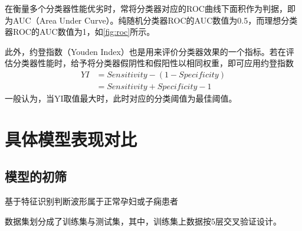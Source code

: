在衡量多个分类器性能优劣时，常将分类器对应的ROC曲线下面积作为判据，即为AUC（Area Under Curve）。纯随机分类器ROC的AUC数值为0.5，而理想分类器ROC的AUC数值为1，如\autoref{fig:roc}所示。

此外，约登指数（Youden Index）也是用来评价分类器效果的一个指标。若在评估分类器性能时，给予将分类器假阴性和假阳性以相同权重，即可应用约登指数
\begin{equation}
      \label{equ:yi}
      \begin{aligned}
            YI&=Sensitivity-(1-Specificity)\\
            &=Sensitivity+Specificity-1
      \end{aligned}
\end{equation}
一般认为，当YI取值最大时，此时对应的分类阈值为最佳阈值\cite{cwl}。
\section{具体模型表现对比}
\subsection{模型的初筛}

基于特征识别判断波形属于正常孕妇或子痫患者


数据集划分成了训练集与测试集，其中，训练集上数据按5层交叉验证设计。


